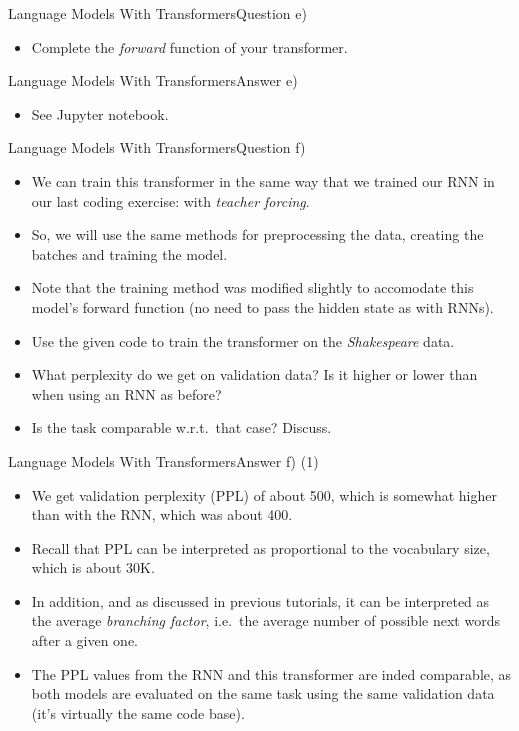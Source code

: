 \documentclass[t]{beamer}
\begin{document}
\begin{frame}{Language Models With Transformers}{Question e)}
    \begin{itemize}
        \item Complete the \emph{forward} function of your transformer.
    \end{itemize}
\end{frame}

\begin{frame}{Language Models With Transformers}{Answer e)}
    \begin{itemize}
        \item See Jupyter notebook.
    \end{itemize}
\end{frame}

\begin{frame}{Language Models With Transformers}{Question f)}
    \begin{itemize}
        \item We can train this transformer in the same way that we trained our
              RNN in our last coding exercise: with \emph{teacher forcing}.
        \item So, we will use the same methods for preprocessing the data,
              creating the batches and training the model.
        \item Note that the training method was modified slightly to accomodate
              this model's forward function (no need to pass the hidden state as
              with RNNs).
        \item Use the given code to train the transformer on the
              \emph{Shakespeare} data.
        \item What perplexity do we get on validation data?
              Is it higher or lower than when using an RNN as before?
        \item Is the task comparable w.r.t.\ that case? Discuss.
    \end{itemize}
\end{frame}

\begin{frame}{Language Models With Transformers}{Answer f) (1)}
    \begin{itemize}
        \item We get validation perplexity (PPL) of about 500, which is somewhat
              higher than with the RNN, which was about 400.
        \item Recall that PPL can be interpreted as proportional to the
              vocabulary size, which is about 30K.
        \item In addition, and as discussed in previous tutorials, it can be
              interpreted as the average \emph{branching factor}, i.e.\ the
              average number of possible next words after a given one.
        \item The PPL values from the RNN and this transformer are inded
              comparable,
              as both models are evaluated on the same task using the same
              validation data (it's virtually the same code base).
    \end{itemize}
\end{frame}
\end{document}

